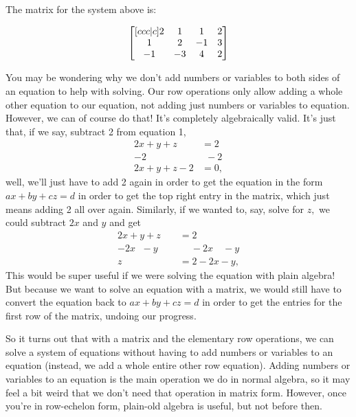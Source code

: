 \documentclass[12pt]{scrartcl}
\begin{document}
The matrix for the system above is:

\[\bmat[ccc|c] 2 & 1 & 1 & 2 \\ 1 & 2 & -1 & 3 \\ -1 & -3 & 4 & 2 \emat\]

You may be wondering why we don't add numbers or variables to both sides of an equation to help with solving. Our row operations only allow adding a whole other equation to our equation, not adding just numbers or variables to equation. However, we can of course do that! It's completely algebraically valid. It's just that, if we say, subtract 2 from equation 1,
\begin{align*}
    2x + y + z &= 2\\
    -2 \quad \: &\:\:-2 \\
    2x + y + z - 2 &= 0,
\end{align*}
well, we'll just have to add 2 again in order to get the equation in the form $ax + by + cz = d$ in order to get the top right entry in the matrix, which just means adding 2 all over again. Similarly, if we wanted to, say, solve for $z,$ we could subtract $2x$ and $y$ and get
\begin{align*}
    2x + y + z &= 2\\
    \text{$-$}2x \:\:\, \text{$-$}y\quad\:\: &\quad \: \text{$-$}2x \quad \text{$-$}y \\
   z &= 2 - 2x - y,
\end{align*}
This would be super useful if we were solving the equation with plain algebra! But because we want to solve an equation with a matrix, we would still have to convert the equation back to $ax + by + cz = d$ in order to get the entries for the first row of the matrix, undoing our progress.

So it turns out that with a matrix and the elementary row operations, we can solve a system of equations without having to add numbers or variables to an equation (instead, we add a whole entire other row equation). Adding numbers or variables to an equation is the main operation we do in normal algebra, so it may feel a bit weird that we don't need that operation in matrix form. However, once you're in row-echelon form, plain-old algebra is useful, but not before then.\footnotemark

\end{document}
